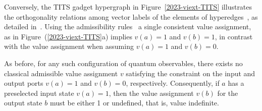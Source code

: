 \documentclass[%
 superscriptaddress,
  preprint,
 showpacs,
 showkeys,
 nofootinbib,
  amsmath,amssymb,
 pra,
  longbibliography,
  floatfix,
 ]{revtex4-2}
\theoremstyle{definition}
\begin{document}
Conversely, the TITS gadget hypergraph in Figure~\ref{2023-viext-TITS}
illustrates the orthogonality relations among vector labels of the elements of hyperedges~\cite{lovasz-79}, as detailed in~\cite[Table~I]{2018-minimalYIYS}.
Using the admissibility rules~\cite[Fig.~(24.2.a)]{Svozil-2018-p} a single consistent value assignment,
as in Figure~(\ref{2023-viext-TITS}a) implies $v(a)=1$ and $v(b)=1$, in contrast with
the value assignment  when assuming $v(a)=1$ and $v(b)=0$.

As before, for any such configuration of quantum observables, there exists no classical admissible value assignment $v$
satisfying the constraint on the input and output ports $v(a)=1$ and $v(b)=0$, respectively.
Consequently, if $a$ has a preselected input state $v(a)=1$, then the value assignment $v(b)$ for the output state $b$ must be either 1 or undefined,
that is, value indefinite.
\end{document}
